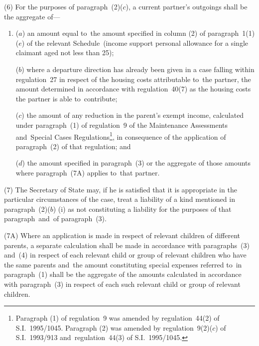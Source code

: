 \documentclass[12pt,a4paper]{article}
\begin{document}
(6) For the purposes of paragraph~(2)($c$), a current partner’s outgoings shall be the aggregate of—
\begin{enumerate}\item[]
($a$) an amount equal to~the amount specified in column (2) of paragraph~1(1)($e$) of the relevant Schedule~(income support personal allowance for a single claimant aged not less than 25);

\begin{sloppypar}
($b$) where a departure direction has already been given in a case falling within
regulation~27 in respect of the housing costs attributable to~the partner, the
amount determined in accordance with regulation~40(7) as the housing costs the
partner is able to~contribute;
\end{sloppypar}

($c$) the amount of any reduction in the parent’s exempt income, calculated under
paragraph~(1) of regulation~9 of the Maintenance Assessments and~Special Cases
Regulations\footnote{\frenchspacing Paragraph (1) of regulation~9 was amended by regulation~44(2) of S.I.~1995/1045. Paragraph (2) was amended by regulation~9(2)($c$) of S.I.~1993/913 and~regulation~44(3) of S.I.~1995/1045.}, in consequence of the application of paragraph~(2) of that
regulation; and

($d$) the amount specified in paragraph~(3)
or the aggregate of those amounts where paragraph~(7A) applies to~that partner.  %
\end{enumerate}

(7) The Secretary of State may, if he is satisfied that it is appropriate in the particular circumstances of the case, treat a liability of a kind mentioned in paragraph~(2)($b$)%
(i)  %
as not constituting a liability for the purposes of that paragraph~and~of paragraph~(3).

(7A) Where an application is made in respect of relevant children of different parents, a separate calculation shall be made in accordance with paragraphs~(3) and~(4) in respect of each relevant child or group of relevant children who have the same parents and~the amount constituting special expenses referred to~in paragraph~(1) shall be the aggregate of the amounts calculated in accordance with paragraph~(3) in respect of each such relevant child or group of relevant children.
\end{document}
